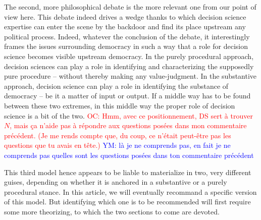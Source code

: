 \documentclass[preprint, french, english, 11pt]{elsarticle}%
\newcommand{\commentYM}[1]{\textcolor{blue}{YM: #1}}
\newcommand{\commentOC}[1]{\textcolor{red}{OC: #1}}
\begin{document}
The second, more philosophical debate is the more relevant one from our point of view here. This debate indeed drives a wedge thanks to which decision science expertise can enter the scene by the backdoor and find its place upstream any political process. Indeed, whatever the conclusion of the debate, it interestingly frames the issues surrounding democracy in such a way that a role for decision science becomes visible upstream democracy. In the purely procedural approach, decision sciences can play a role in identifying and characterizing the supposedly pure procedure -- without thereby making any value-judgment. In the substantive approach, decision science can play a role in identifying the substance of democracy -- be it a matter of input or output. If a middle way has to be found between these two extremes, in this middle way the proper role of decision science is a bit of the two.
\commentOC{Hmm, avec ce positionnement, DS sert à trouver $N$, mais ça n’aide pas à répondre aux questions posées dans mon commentaire précédent. (Je me rends compte que, du coup, ce n’était peut-être pas les questions que tu avais en tête.)}
\commentYM{là je ne comprends pas, en fait je ne comprends pas quelles sont les questions posées dans ton commentaire précédent}

This third model hence appears to be liable to materialize in two, very different guises, depending on whether it is anchored in a substantive or a purely procedural stance. In this article, we will eventually recommand a specific version of this model. But identifying which one is to be recommended will first require some more theorizing, to which the two sections to come are devoted. 
\end{document}
